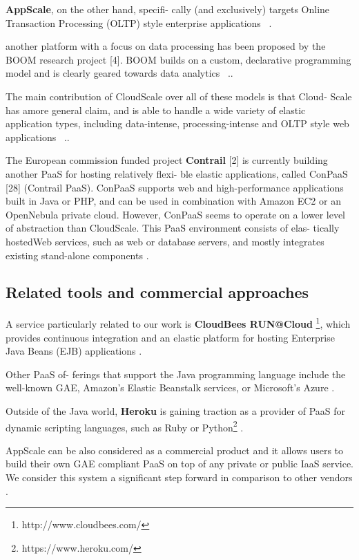 \documentclass{sig-alternate}
\begin{document}
{\textbf{AppScale}, on the other hand, specifi- cally (and exclusively) targets Online Transaction Processing (OLTP) style enterprise applications ~\cite{Leitner2013}.
 
another platform with a focus on data processing has been proposed by the BOOM research project [4]. BOOM builds on a custom, declarative programming model and is clearly geared towards data analytics ~\cite{Leitner2013}..

The main contribution of CloudScale over all of these models is that Cloud- Scale has amore general claim, and is able to handle a wide variety of elastic application types, including data-intense, processing-intense and OLTP style web applications ~\cite{Leitner2013}.. 

The European commission funded project \textbf{Contrail} [2] is currently building another PaaS for hosting relatively flexi- ble elastic applications, called ConPaaS [28] (Contrail PaaS). ConPaaS supports web and high-performance applications built in Java or PHP, and can be used in combination with Amazon EC2 or an OpenNebula private cloud. However, ConPaaS seems to operate on a lower level of abstraction than CloudScale. This PaaS environment consists of elas- tically hostedWeb services, such as web or database servers, and mostly integrates existing stand-alone components \cite{Leitner2013}.


\subsection{Related tools and commercial approaches}

A service particularly related to our work is \textbf{CloudBees RUN@Cloud} \footnote{http://www.cloudbees.com/}, which provides continuous integration and an elastic platform for hosting Enterprise Java Beans (EJB) applications \cite{Leitner2013}.

Other PaaS of- ferings that support the Java programming language include the well-known GAE, Amazon’s Elastic Beanstalk services, or Microsoft’s Azure \cite{Leitner2013}. 

Outside of the Java world,\textbf{ Heroku} is gaining traction as a provider of PaaS for dynamic scripting languages, such as Ruby or Python\footnote{https://www.heroku.com/} \cite{Leitner2013}.

AppScale can be also considered as a commercial product and it allows users to build their own GAE compliant PaaS on top of any private or public IaaS service. We consider this system a significant step forward in comparison to other vendors \cite{Leitner2013}.

}
\end{document}
